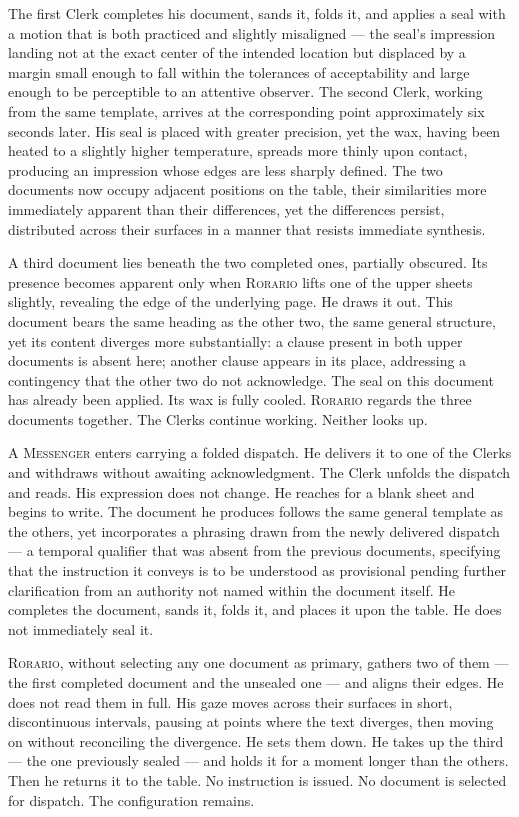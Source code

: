 \documentclass[12pt, oneside]{article}
\newenvironment{action}{%
  \vspace{0.6em}%
  \noindent\ignorespaces%
}{%
  \par\vspace{0.6em}%
}
\begin{document}
\begin{action}
The first Clerk completes his document, sands it, folds it, and applies a seal with a motion that is both practiced and slightly misaligned --- the seal's impression landing not at the exact center of the intended location but displaced by a margin small enough to fall within the tolerances of acceptability and large enough to be perceptible to an attentive observer. The second Clerk, working from the same template, arrives at the corresponding point approximately six seconds later. His seal is placed with greater precision, yet the wax, having been heated to a slightly higher temperature, spreads more thinly upon contact, producing an impression whose edges are less sharply defined. The two documents now occupy adjacent positions on the table, their similarities more immediately apparent than their differences, yet the differences persist, distributed across their surfaces in a manner that resists immediate synthesis.

A third document lies beneath the two completed ones, partially obscured. Its presence becomes apparent only when \textsc{Rorario} lifts one of the upper sheets slightly, revealing the edge of the underlying page. He draws it out. This document bears the same heading as the other two, the same general structure, yet its content diverges more substantially: a clause present in both upper documents is absent here; another clause appears in its place, addressing a contingency that the other two do not acknowledge. The seal on this document has already been applied. Its wax is fully cooled. \textsc{Rorario} regards the three documents together. The Clerks continue working. Neither looks up.
\end{action}

\begin{action}
A \textsc{Messenger} enters carrying a folded dispatch. He delivers it to one of the Clerks and withdraws without awaiting acknowledgment. The Clerk unfolds the dispatch and reads. His expression does not change. He reaches for a blank sheet and begins to write. The document he produces follows the same general template as the others, yet incorporates a phrasing drawn from the newly delivered dispatch --- a temporal qualifier that was absent from the previous documents, specifying that the instruction it conveys is to be understood as provisional pending further clarification from an authority not named within the document itself. He completes the document, sands it, folds it, and places it upon the table. He does not immediately seal it.

\textsc{Rorario}, without selecting any one document as primary, gathers two of them --- the first completed document and the unsealed one --- and aligns their edges. He does not read them in full. His gaze moves across their surfaces in short, discontinuous intervals, pausing at points where the text diverges, then moving on without reconciling the divergence. He sets them down. He takes up the third --- the one previously sealed --- and holds it for a moment longer than the others. Then he returns it to the table. No instruction is issued. No document is selected for dispatch. The configuration remains.
\end{action}
\end{document}

